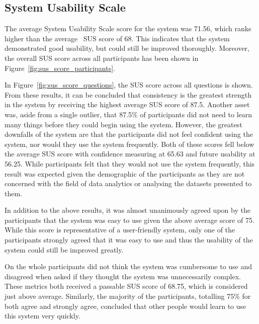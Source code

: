 {{	}

	\subsection{System Usability Scale} {
	\label{sec:sus_results}

		The average System Usability Scale score for the system was 71.56, which ranks higher than the average~\parencite{brooke2013sus} SUS score of 68. This indicates that the system demonstrated good usability, but could still be improved thoroughly. Moreover, the overall SUS score across all participants has been shown in Figure~\ref{fig:sus_score_participants}.

		

		In Figure~\ref{fig:sus_score_questions}, the SUS score across all questions is shown. From these results, it can be concluded that consistency is the greatest strength in the system by receiving the highest average SUS score of 87.5. Another asset was, aside from a single outlier, that 87.5\% of participants did not need to learn many things before they could begin using the system. However, the greatest downfalls of the system are that the participants did not feel confident using the system, nor would they use the system frequently. Both of these scores fell below the average SUS score with confidence measuring at 65.63 and future usability at 56.25. While participants felt that they would not use the system frequently, this result was expected given the demographic of the participants as they are not concerned with the field of data analytics or analysing the datasets presented to them.

		

		In addition to the above results, it was almost unanimously agreed upon by the participants that the system was easy to use given the above average score of 75. While this score is representative of a user-friendly system, only one of the participants strongly agreed that it was easy to use and thus the usability of the system could still be improved greatly. 

		On the whole participants did not think the system was cumbersome to use and disagreed when asked if they thought the system was unnecessarily complex. These metrics both received a passable SUS score of 68.75, which is considered just above average. Similarly, the majority of the participants, totalling 75\% for both agree and strongly agree, concluded that other people would learn to use this system very quickly.

}}

